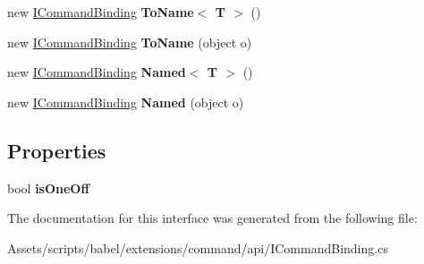 \begin{DoxyCompactItemize}
\item 
\hypertarget{interfacebabel_1_1extensions_1_1command_1_1api_1_1_i_command_binding_a15415a340496a86a18311dd90fdefbbc}{new \hyperlink{interfacebabel_1_1extensions_1_1command_1_1api_1_1_i_command_binding}{I\-Command\-Binding} {\bfseries To\-Name$<$ T $>$} ()}\label{interfacebabel_1_1extensions_1_1command_1_1api_1_1_i_command_binding_a15415a340496a86a18311dd90fdefbbc}

\item 
\hypertarget{interfacebabel_1_1extensions_1_1command_1_1api_1_1_i_command_binding_aa02a5921bf65ed12f82d8f7ba55e8cc6}{new \hyperlink{interfacebabel_1_1extensions_1_1command_1_1api_1_1_i_command_binding}{I\-Command\-Binding} {\bfseries To\-Name} (object o)}\label{interfacebabel_1_1extensions_1_1command_1_1api_1_1_i_command_binding_aa02a5921bf65ed12f82d8f7ba55e8cc6}

\item 
\hypertarget{interfacebabel_1_1extensions_1_1command_1_1api_1_1_i_command_binding_a30fd56f00f01343c6c93003b9d10563f}{new \hyperlink{interfacebabel_1_1extensions_1_1command_1_1api_1_1_i_command_binding}{I\-Command\-Binding} {\bfseries Named$<$ T $>$} ()}\label{interfacebabel_1_1extensions_1_1command_1_1api_1_1_i_command_binding_a30fd56f00f01343c6c93003b9d10563f}

\item 
\hypertarget{interfacebabel_1_1extensions_1_1command_1_1api_1_1_i_command_binding_ac7d322da8ff7dcd3705d91ecd0f37665}{new \hyperlink{interfacebabel_1_1extensions_1_1command_1_1api_1_1_i_command_binding}{I\-Command\-Binding} {\bfseries Named} (object o)}\label{interfacebabel_1_1extensions_1_1command_1_1api_1_1_i_command_binding_ac7d322da8ff7dcd3705d91ecd0f37665}

\end{DoxyCompactItemize}
\subsection*{Properties}
\begin{DoxyCompactItemize}
\item 
\hypertarget{interfacebabel_1_1extensions_1_1command_1_1api_1_1_i_command_binding_aa51a5682b647d02f867fda10f3315c54}{bool {\bfseries is\-One\-Off}}\label{interfacebabel_1_1extensions_1_1command_1_1api_1_1_i_command_binding_aa51a5682b647d02f867fda10f3315c54}

\end{DoxyCompactItemize}


The documentation for this interface was generated from the following file\-:\begin{DoxyCompactItemize}
\item 
Assets/scripts/babel/extensions/command/api/I\-Command\-Binding.\-cs\end{DoxyCompactItemize}

